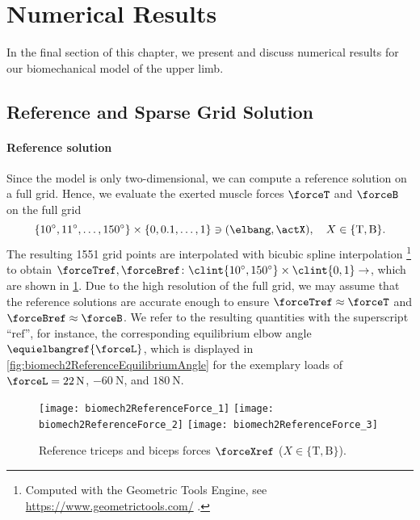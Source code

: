\section{Numerical Results}
\label{sec:73results}


\noindent
In the final section of this chapter,
we present and discuss numerical results for our
biomechanical model of the upper limb.



\subsection{Reference and Sparse Grid Solution}
\label{sec:731solutionTypes}

\paragraph{Reference solution}

Since the model is only two-dimensional, we can compute a reference solution
on a full grid.
Hence, we evaluate the exerted muscle forces $\forceT$ and $\forceB$ on
the full grid
\begin{equation}
  \{\ang{10}, \ang{11}, \dotsc, \ang{150}\} \times \{0, 0.1, \dotsc, 1\}
  \ni (\elbang, \actX),\quad
  X \in \{\mathrm{T}, \mathrm{B}\}.
\end{equation}
The resulting \num{1551} grid points
are interpolated with bicubic spline interpolation%
\footnote{%
  Computed with the Geometric Tools Engine, see
  \url{https://www.geometrictools.com/}
  \cite{Schneider03Geometric}.
}
to obtain 
$\forceTref, \forceBref\colon
\clint{\ang{10}, \ang{150}} \times \clint{0, 1} \to \real$,
which are shown in \cref{fig:biomech2ReferenceForce}.
Due to the high resolution of the full grid,
we may assume that the reference solutions are accurate enough
to ensure $\forceTref \approx \forceT$ and $\forceBref \approx \forceB$.
We refer to the resulting quantities with the superscript ``$\mathrm{ref}$'',
for instance, the corresponding equilibrium elbow angle
$\equielbangref{\forceL}$, which is displayed in
\cref{fig:biomech2ReferenceEquilibriumAngle}
for the exemplary loads of $\forceL = \SI{22}{\newton}$,
$\SI{-60}{\newton}$, and $\SI{180}{\newton}$.

\begin{figure}
  \texttt{[image: biomech2ReferenceForce\_1]}%
  \;\;%
  \texttt{[image: biomech2ReferenceForce\_2]}%
  \hfill%
  \rlap{\raisebox{53mm}{\;$\forceXref$ [\si{\kilo\newton}]}}%
  \texttt{[image: biomech2ReferenceForce\_3]}%
  \caption[Reference triceps and biceps forces]{%
    Reference triceps and biceps forces $\forceXref$
    ($X \in \{\mathrm{T}, \mathrm{B}\}$).%
  }%
  \label{fig:biomech2ReferenceForce}%
\end{figure}


